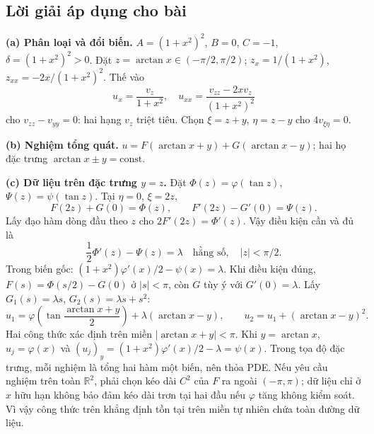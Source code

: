 \documentclass[10pt,a4paper]{article}
\begin{document}
\subsection*{Lời giải áp dụng cho bài}
\textbf{(a) Phân loại và đổi biến.} $A=(1+x^2)^2$, $B=0$, $C=-1$, $\delta=(1+x^2)^2>0$. Đặt $z=\arctan x\in(-\pi/2,\pi/2)$; $z_x=1/(1+x^2)$, $z_{xx}=-2x/(1+x^2)^2$. Thế vào
\[u_x=\frac{v_z}{1+x^2},\quad u_{xx}=\frac{v_{zz}-2xv_z}{(1+x^2)^2}\]
cho $v_{zz}-v_{yy}=0$: hai hạng $v_z$ triệt tiêu. Chọn $\xi=z+y$, $\eta=z-y$ cho $4v_{\xi\eta}=0$.

\textbf{(b) Nghiệm tổng quát.} $u=F(\arctan x+y)+G(\arctan x-y)$; hai họ đặc trưng $\arctan x\pm y=\mathrm{const}$.

\textbf{(c) Dữ liệu trên đặc trưng $y=z$.} Đặt $\Phi(z)=\varphi(\tan z)$, $\Psi(z)=\psi(\tan z)$. Tại $\eta=0$, $\xi=2z$,
\[F(2z)+G(0)=\Phi(z),\qquad F'(2z)-G'(0)=\Psi(z).\]
Lấy đạo hàm dòng đầu theo $z$ cho $2F'(2z)=\Phi'(z)$. Vậy điều kiện cần và đủ là
\[\boxed{\frac12\Phi'(z)-\Psi(z)=\lambda\quad\text{hằng số},\quad |z|<\pi/2.}\]
Trong biến gốc: $(1+x^2)\varphi'(x)/2-\psi(x)=\lambda$. Khi điều kiện đúng, $F(s)=\Phi(s/2)-G(0)$ ở $|s|<\pi$, còn $G$ tùy ý với $G'(0)=\lambda$. Lấy $G_1(s)=\lambda s$, $G_2(s)=\lambda s+s^2$:
\[u_1=\varphi\!\left(\tan\frac{\arctan x+y}{2}\right)+\lambda(\arctan x-y),\qquad
u_2=u_1+(\arctan x-y)^2.\]
Hai công thức xác định trên miền $|\arctan x+y|<\pi$. Khi $y=\arctan x$, $u_j=\varphi(x)$ và $(u_j)_y=(1+x^2)\varphi'(x)/2-\lambda=\psi(x)$. Trong tọa độ đặc trưng, mỗi nghiệm là tổng hai hàm một biến, nên thỏa PDE. Nếu yêu cầu nghiệm trên toàn $\mathbb R^2$, phải chọn kéo dài $C^2$ của $F$ ra ngoài $(-\pi,\pi)$; dữ liệu chỉ ở $x$ hữu hạn không bảo đảm kéo dài trơn tại hai đầu nếu $\varphi$ tăng không kiểm soát. Vì vậy công thức trên khẳng định tồn tại trên miền tự nhiên chứa toàn đường dữ liệu.
\end{document}
